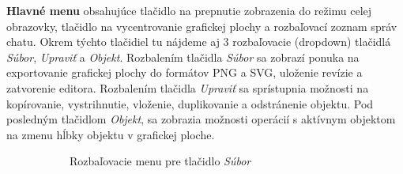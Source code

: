 \textbf{Hlavné menu} obsahujúce tlačidlo na prepnutie zobrazenia do režimu celej obrazovky, tlačidlo na vycentrovanie grafickej plochy a rozbaľovací zoznam správ chatu. Okrem týchto tlačidiel tu nájdeme aj 3 rozbaľovacie (dropdown) tlačidlá \textit{Súbor}, \textit{Upraviť} a \textit{Objekt}. Rozbalením tlačidla \textit{Súbor} sa zobrazí ponuka na exportovanie grafickej plochy do formátov PNG a SVG, uloženie revízie a zatvorenie editora. Rozbalením tlačidla \textit{Upraviť} sa sprístupnia možnosti na kopírovanie, vystrihnutie, vloženie, duplikovanie a odstránenie objektu. Pod posledným tlačidlom \textit{Objekt}, sa zobrazia možnosti operácií s aktívnym objektom na zmenu hĺbky objektu v grafickej ploche.
\begin{figure}[H]
	\centering
	\begin{subfigure}[t]{0.48\linewidth}	
		\caption{Rozbaľovacie menu pre tlačidlo \textit{Súbor}}
	\end{subfigure}
	\quad
	\begin{subfigure}[t]{0.48\linewidth}	

\end{subfigure}
\end{figure}
